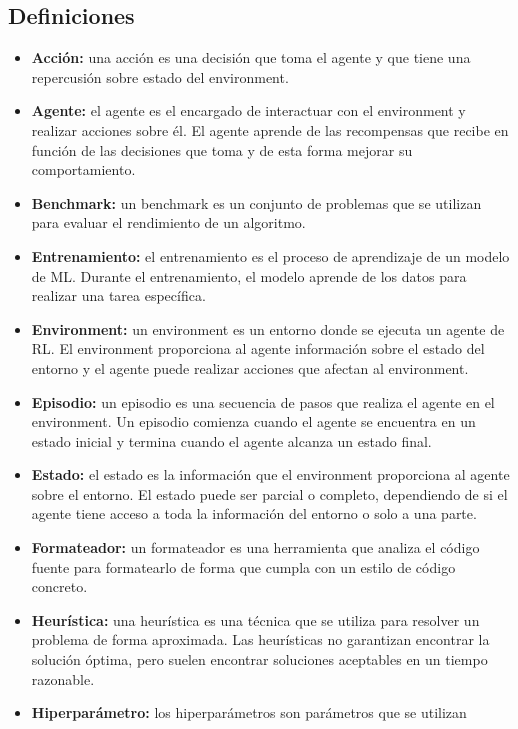 \subsection{Definiciones}
\begin{itemize}
    \item \textbf{Acción:} una acción es una decisión que toma el agente y que tiene una
    repercusión sobre estado del environment.
    \item \textbf{Agente:} el agente es el encargado de interactuar con el environment
    y realizar acciones sobre él. El agente aprende de las recompensas que recibe
    en función de las decisiones que toma y de esta forma mejorar su comportamiento.
    \item \textbf{Benchmark:} un benchmark es un conjunto de problemas que se utilizan
    para evaluar el rendimiento de un algoritmo.
    \item \textbf{Entrenamiento:} el entrenamiento es el proceso de aprendizaje de un
    modelo de ML. Durante el entrenamiento, el modelo aprende de los datos para realizar
    una tarea específica.
    \item \textbf{Environment: } un environment es un entorno donde se ejecuta un agente
    de RL. El environment proporciona al agente información sobre el estado del entorno
    y el agente puede realizar acciones que afectan al environment.
    \item \textbf{Episodio:} un episodio es una secuencia de pasos que realiza el agente
    en el environment. Un episodio comienza cuando el agente se encuentra en un estado
    inicial y termina cuando el agente alcanza un estado final.
    \item \textbf{Estado:} el estado es la información que el environment proporciona
    al agente sobre el entorno. El estado puede ser parcial o completo, dependiendo
    de si el agente tiene acceso a toda la información del entorno o solo a una parte.
    \item \textbf{Formateador:} un formateador es una herramienta que analiza el código fuente
    para formatearlo de forma que cumpla con un estilo de código concreto.
    \item \textbf{Heurística:} una heurística es una técnica que se utiliza para resolver
    un problema de forma aproximada. Las heurísticas no garantizan encontrar la solución
    óptima, pero suelen encontrar soluciones aceptables en un tiempo razonable.
    \item \textbf{Hiperparámetro:} los hiperparámetros son parámetros que se utilizan

\end{itemize}
